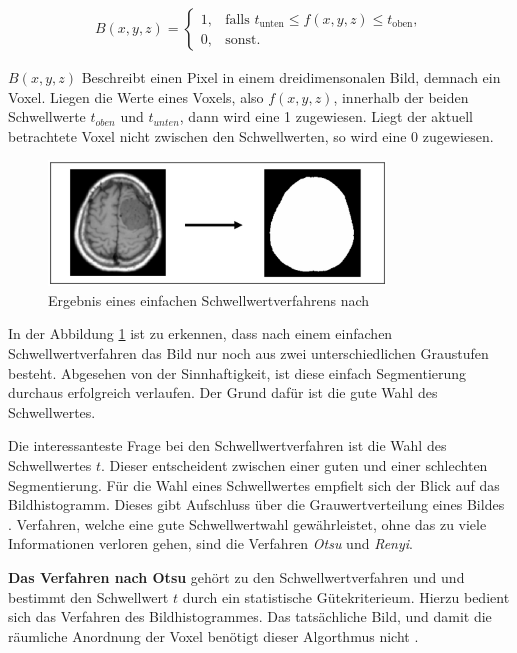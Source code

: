 \begin{align}
	\label{equ:schwellwertverfahren}B(x, y, z) = \begin{cases}1,&\text{falls }t_{\text{unten}}\leq f(x, y, z) \leq t_{\text{oben}}, \\ 0,&\text{sonst}.\end{cases}
\end{align}

$B(x, y, z)$ Beschreibt einen Pixel in einem dreidimensonalen Bild, demnach ein Voxel.
Liegen die Werte eines Voxels, also $f(x, y, z)$, innerhalb der beiden
Schwellwerte $t_{oben}$ und $t_{unten}$, dann wird eine 1 zugewiesen. Liegt der
aktuell betrachtete Voxel nicht zwischen den Schwellwerten, so wird eine 0 zugewiesen.

\begin{figure}[h]
	\centering
	\includegraphics[width=0.8\textwidth]{img/beispiel_schwellwertverfahren.jpg}
	\caption{Ergebnis eines einfachen Schwellwertverfahrens nach \citet[Seite 96]{handels2000}}
	\label{fig:binäres_schwellwertverfahren}
\end{figure}

In der Abbildung \ref{fig:binäres_schwellwertverfahren} ist zu erkennen, dass nach
einem einfachen Schwellwertverfahren das Bild nur noch aus zwei unterschiedlichen
Graustufen besteht. Abgesehen von der Sinnhaftigkeit, ist diese einfach Segmentierung
durchaus erfolgreich verlaufen. Der Grund dafür ist die gute Wahl des
Schwellwertes.

Die interessanteste Frage bei den Schwellwertverfahren ist die Wahl des
Schwellwertes $t$. Dieser entscheident zwischen einer guten und einer schlechten
Segmentierung. Für die Wahl eines Schwellwertes empfielt sich der Blick auf das
Bildhistogramm. Dieses gibt Aufschluss über die Grauwertverteilung eines Bildes \citep[vgl.][Seite361]{lehmann2013bildverarbeitung}.
Verfahren, welche eine gute Schwellwertwahl gewährleistet, ohne das zu
viele Informationen verloren gehen, sind die Verfahren \textit{Otsu} und \textit{Renyi}.

\pagebreak

\textbf{Das Verfahren nach Otsu} gehört zu den Schwellwertverfahren und und
bestimmt den Schwellwert $t$ durch ein statistische Gütekriterieum. Hierzu bedient
sich das Verfahren des Bildhistogrammes. Das tatsächliche Bild, und damit die räumliche
Anordnung der Voxel benötigt dieser Algorthmus nicht \citep[vgl.][Seite 264]{lehmann2013bildverarbeitung}.

